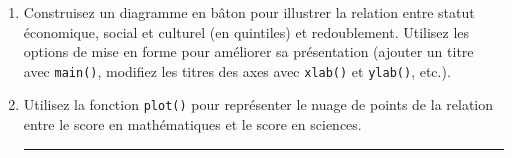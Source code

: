\documentclass[12pt,twosided, notitlepage]{book}
\newenvironment{Shaded}{}{}
\newcommand{\KeywordTok}[1]{\textcolor[rgb]{0.00,0.00,1.00}{{#1}}}
\newcommand{\DataTypeTok}[1]{{#1}}
\newcommand{\CharTok}[1]{\textcolor[rgb]{0.00,0.50,0.50}{{#1}}}
\newcommand{\StringTok}[1]{\textcolor[rgb]{0.00,0.50,0.50}{{#1}}}
\newcommand{\NormalTok}[1]{{#1}}
\newif \ifsol
\renewenvironment{Shaded}{\begin{snugshade}}{\end{snugshade}}
\begin{document}
\begin{enumerate}
\def\labelenumi{\alph{enumi}.}
\item
  Construisez un diagramme en bâton pour illustrer la relation entre
  statut économique, social et culturel (en quintiles) et redoublement.
  Utilisez les options de mise en forme pour améliorer sa présentation
  (ajouter un titre avec \texttt{main()}, modifiez les titres des axes
  avec \texttt{xlab()} et \texttt{ylab()},
  etc.).

  \ifsol 

  \begin{center} \rule{0.5\linewidth}{\linethickness}\end{center}

\begin{Shaded}
\begin{Highlighting}[]
\KeywordTok{barplot}\NormalTok{(}
  \KeywordTok{table}\NormalTok{(stu2$redoublant, stu2$escsq)}
  \NormalTok{, }\DataTypeTok{main =} \StringTok{"Statut économique, social et culturel}\CharTok{\textbackslash{}n}\StringTok{et redoublement"}
  \NormalTok{, }\DataTypeTok{xlab =} \StringTok{"Statut économique, social et cuturel"}
  \NormalTok{, }\DataTypeTok{ylab =} \StringTok{"Répartition des redoublants"}
  \NormalTok{, }\DataTypeTok{legend.text =} \KeywordTok{c}\NormalTok{(}\StringTok{"Non-redoublant"}\NormalTok{, }\StringTok{"Redoublant"}\NormalTok{)}
  \NormalTok{, }\DataTypeTok{args.legend =} \KeywordTok{list}\NormalTok{(}\DataTypeTok{x =} \StringTok{"topleft"}\NormalTok{, }\DataTypeTok{bg =} \StringTok{"white"}\NormalTok{)}
\NormalTok{)}
\end{Highlighting}
\end{Shaded}

  \begin{center}\texttt{[image: livret\_files/figure-latex/unnamed-chunk-534-1]} \end{center}

  \begin{center} \rule{0.5\linewidth}{\linethickness}\end{center}

  \bigskip  \fi 
\item
  Utilisez la fonction \texttt{plot()} pour représenter le nuage de
  points de la relation entre le score en mathématiques et le score en
  sciences.

  \ifsol 

  \begin{center} \rule{0.5\linewidth}{\linethickness}\end{center}


\end{enumerate}
\end{document}

